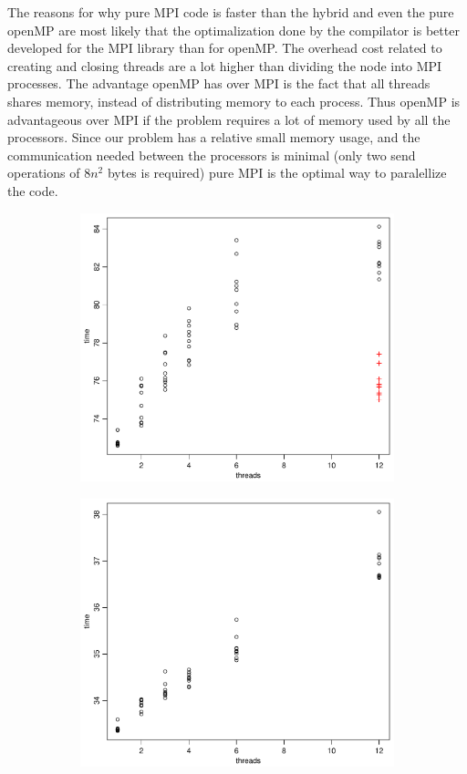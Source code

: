 The reasons for why pure MPI code is faster than the hybrid and even the pure openMP are most likely that the optimalization done by the compilator is better developed for the MPI library than for openMP. The overhead cost related to creating and closing threads are a lot higher than dividing the node into MPI processes. The advantage openMP has over MPI is the fact that all threads shares memory, instead of distributing memory to each process. Thus openMP is advantageous over MPI if the problem requires a lot of memory used by all the processors. Since our problem has a relative small memory usage, and the communication needed between the processors is minimal (only two send operations of $8n^2$ bytes is required) pure MPI is the optimal way to paralellize the code.  
\\
\begin{figure}[h!]
  \centering
  \begin{subfigure}[b]{0.48\textwidth}
    \includegraphics[width=\textwidth]{./Figures/taskc1.pdf}
  \end{subfigure}%
  \quad
  \begin{subfigure}[b]{0.48\textwidth}
    \includegraphics[width=\textwidth]{./Figures/taskc2.pdf}

\end{subfigure}
\end{figure}
